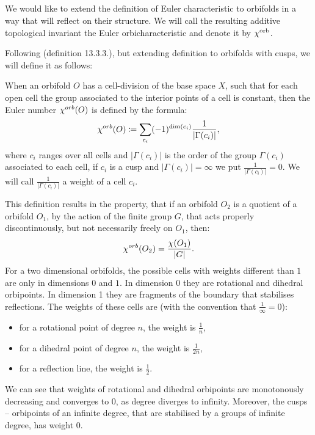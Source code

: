 
\subsection{\Eoc}\label{Eoc}\label{extended_Euler_orbicharacteristic}
We would like to extend the definition of Euler characteristic to orbifolds in a way 
that will reflect on their structure. 
We will call the resulting additive topological invariant the Euler orbicharacteristic 
and denote it by $\chi^{\rm orb}$.


Following \cite{Thurston1979} (definition 13.3.3.), but extending 
definition to orbifolds with cusps, we will define it as follows:
\begin{definition}
When an orbifold $O$ has a cell-division of the base space $X$, such that for each
open cell the group associated to
the interior points of a cell is constant, then the Euler number ${\chi^{orb}(O)}$ is defined by
the formula:
\begin{equation}
{\chi^{orb}(O)} \coloneqq \sum_{c_i} (-1)^{ \mathrm{dim}(c_i)}\frac{1}{|\Gamma(c_i)|},
\end{equation}
where $c_i$ ranges over all cells and $|\Gamma(c_i)|$ is the order of the group $\Gamma(c_i)$ 
associated to each cell, if $c_i$ is a cusp and $|\Gamma(c_i)| = \infty$ we put 
$\frac{1}{|\Gamma(c_i)|} = 0$. We will call $\frac{1}{|\Gamma(c_i)|}$ a weight of a cell $c_i$.
\end{definition} 

This definition results in the property, that if an orbifold $O_2$ is a quotient 
of a orbifold $O_1$, by the action of the finite group $G$, that acts properly 
discontinuously, but not necessarily freely on $O_1$, then:
\begin{equation}\label{acting on an orbifold cho}
{\chi^{orb}(O_2)} = \frac{\chi(O_1)}{|G|}.
\end{equation}
For a two dimensional orbifolds, the possible cells with weights different than $1$ are 
only in dimensions $0$ and $1$. In dimension 0 they are rotational and dihedral 
orbipoints. In dimension 1 they are fragments of the boundary that stabilises reflections. 
The weights of these cells are (with the convention that $\frac{1}{\infty} = 0$):
\begin{itemize}
\item for a rotational point of degree $n$, the weight is $\frac{1}{n}$,
\item for a dihedral point of degree $n$, the weight is $\frac{1}{2n}$,
\item for a reflection line, the weight is $\frac{1}{2}$.
\end{itemize}
We can see that weights of rotational and dihedral orbipoints are monotonously decreasing 
and converges to $0$, as degree diverges to infinity. Moreover, the 
cusps -- orbipoints of an infinite degree, 
that are stabilised by a groups of infinite degree, has weight $0$.

